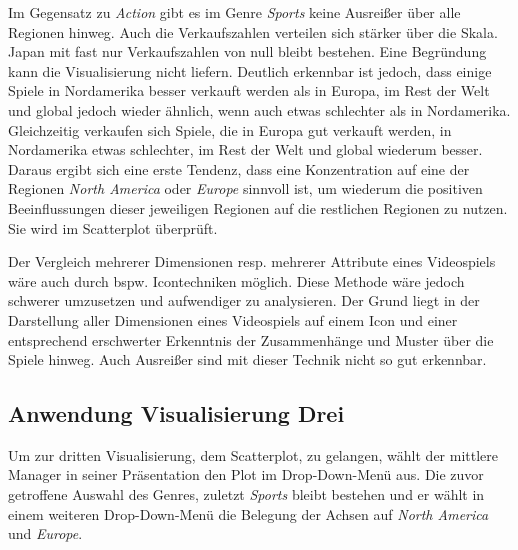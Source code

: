 \documentclass[usegeometry=true]{scrartcl}
\begin{document}
Im Gegensatz zu \textit{Action} gibt es im Genre \textit{Sports} keine Ausreißer über alle Regionen hinweg. Auch die Verkaufszahlen verteilen sich stärker über die Skala. 
Japan mit fast nur Verkaufszahlen von null bleibt bestehen. Eine Begründung kann die Visualisierung nicht liefern.
Deutlich erkennbar ist jedoch, dass einige Spiele in Nordamerika besser verkauft werden als in Europa, im Rest der Welt und global jedoch wieder ähnlich, wenn auch etwas schlechter als in Nordamerika. 
Gleichzeitig verkaufen sich Spiele, die in Europa gut verkauft werden, in Nordamerika etwas schlechter, im Rest der Welt und global wiederum besser. 
Daraus ergibt sich eine erste Tendenz, dass eine Konzentration auf eine der Regionen \textit{North America} oder \textit{Europe} sinnvoll ist, um wiederum die positiven Beeinflussungen dieser jeweiligen Regionen auf die restlichen Regionen zu nutzen. 
Sie wird im Scatterplot überprüft.

Der Vergleich mehrerer Dimensionen resp. mehrerer Attribute eines Videospiels wäre auch durch bspw. Icontechniken möglich. 
Diese Methode wäre jedoch schwerer umzusetzen und aufwendiger zu analysieren. 
Der Grund liegt in der Darstellung aller Dimensionen eines Videospiels auf einem Icon und einer entsprechend erschwerter Erkenntnis der Zusammenhänge und Muster über die Spiele hinweg. 
Auch Ausreißer sind mit dieser Technik nicht so gut erkennbar.

\subsection{Anwendung Visualisierung Drei}
Um zur dritten Visualisierung, dem Scatterplot, zu gelangen, wählt der mittlere Manager in seiner Präsentation den Plot im Drop-Down-Menü aus.
Die zuvor getroffene Auswahl des Genres, zuletzt \textit{Sports} bleibt bestehen und er wählt in einem weiteren Drop-Down-Menü die Belegung der Achsen auf \textit{North America} und \textit{Europe}.
\end{document}
